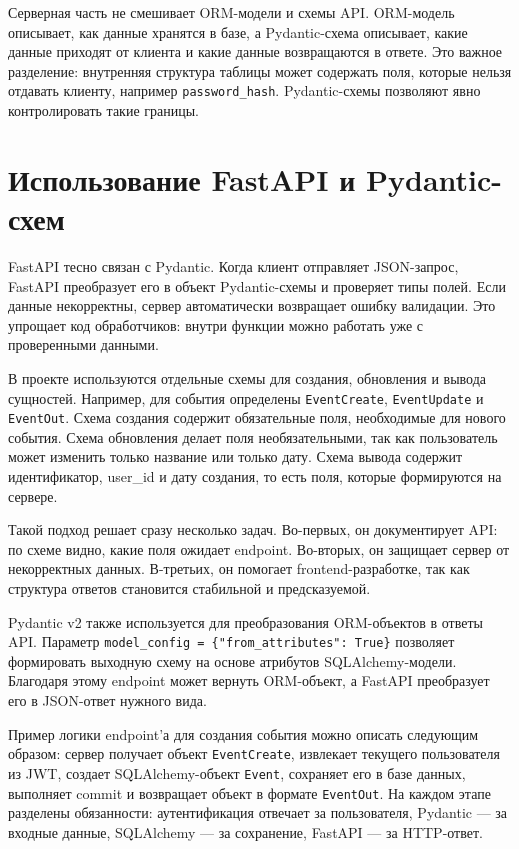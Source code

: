 \documentclass[14pt,a4paper]{extreport}
\begin{document}
Серверная часть не смешивает ORM-модели и схемы API. ORM-модель описывает, как данные хранятся в базе, а Pydantic-схема описывает, какие данные приходят от клиента и какие данные возвращаются в ответе. Это важное разделение: внутренняя структура таблицы может содержать поля, которые нельзя отдавать клиенту, например \texttt{password\_hash}. Pydantic-схемы позволяют явно контролировать такие границы.

\section{Использование FastAPI и Pydantic-схем}

FastAPI тесно связан с Pydantic. Когда клиент отправляет JSON-запрос, FastAPI преобразует его в объект Pydantic-схемы и проверяет типы полей. Если данные некорректны, сервер автоматически возвращает ошибку валидации. Это упрощает код обработчиков: внутри функции можно работать уже с проверенными данными.

В проекте используются отдельные схемы для создания, обновления и вывода сущностей. Например, для события определены \texttt{EventCreate}, \texttt{EventUpdate} и \texttt{EventOut}. Схема создания содержит обязательные поля, необходимые для нового события. Схема обновления делает поля необязательными, так как пользователь может изменить только название или только дату. Схема вывода содержит идентификатор, user\_id и дату создания, то есть поля, которые формируются на сервере.

Такой подход решает сразу несколько задач. Во-первых, он документирует API: по схеме видно, какие поля ожидает endpoint. Во-вторых, он защищает сервер от некорректных данных. В-третьих, он помогает frontend-разработке, так как структура ответов становится стабильной и предсказуемой.

Pydantic v2 также используется для преобразования ORM-объектов в ответы API. Параметр \texttt{model\_config = \{"from\_attributes": True\}} позволяет формировать выходную схему на основе атрибутов SQLAlchemy-модели. Благодаря этому endpoint может вернуть ORM-объект, а FastAPI преобразует его в JSON-ответ нужного вида.

Пример логики endpoint'а для создания события можно описать следующим образом: сервер получает объект \texttt{EventCreate}, извлекает текущего пользователя из JWT, создает SQLAlchemy-объект \texttt{Event}, сохраняет его в базе данных, выполняет commit и возвращает объект в формате \texttt{EventOut}. На каждом этапе разделены обязанности: аутентификация отвечает за пользователя, Pydantic --- за входные данные, SQLAlchemy --- за сохранение, FastAPI --- за HTTP-ответ.
\end{document}
